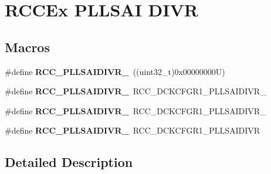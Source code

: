 \hypertarget{group___r_c_c_ex___p_l_l_s_a_i___d_i_v_r}{}\section{R\+C\+C\+Ex P\+L\+L\+S\+AI D\+I\+VR}
\label{group___r_c_c_ex___p_l_l_s_a_i___d_i_v_r}
\subsection*{Macros}
\begin{DoxyCompactItemize}
\item 
\mbox{\label{group___r_c_c_ex___p_l_l_s_a_i___d_i_v_r_gaa982ada83c0104fa63c18d07edc57e6a}} 
\#define {\bfseries R\+C\+C\+\_\+\+P\+L\+L\+S\+A\+I\+D\+I\+V\+R\+\_}~((uint32\+\_\+t)0x00000000\+U)
\item 
\mbox{\label{group___r_c_c_ex___p_l_l_s_a_i___d_i_v_r_ga31afbd678ec2b1bb3cc61971e59f4200}} 
\#define {\bfseries R\+C\+C\+\_\+\+P\+L\+L\+S\+A\+I\+D\+I\+V\+R\+\_}~R\+C\+C\+\_\+\+D\+C\+K\+C\+F\+G\+R1\+\_\+\+P\+L\+L\+S\+A\+I\+D\+I\+V\+R\+\_
\item 
\mbox{\label{group___r_c_c_ex___p_l_l_s_a_i___d_i_v_r_ga5744d352d7815517bbfe46b872497334}} 
\#define {\bfseries R\+C\+C\+\_\+\+P\+L\+L\+S\+A\+I\+D\+I\+V\+R\+\_}~R\+C\+C\+\_\+\+D\+C\+K\+C\+F\+G\+R1\+\_\+\+P\+L\+L\+S\+A\+I\+D\+I\+V\+R\+\_
\item 
\mbox{\label{group___r_c_c_ex___p_l_l_s_a_i___d_i_v_r_ga5e4b0cae8d6c2f0257b161576d497c77}} 
\#define {\bfseries R\+C\+C\+\_\+\+P\+L\+L\+S\+A\+I\+D\+I\+V\+R\+\_}~R\+C\+C\+\_\+\+D\+C\+K\+C\+F\+G\+R1\+\_\+\+P\+L\+L\+S\+A\+I\+D\+I\+VR
\end{DoxyCompactItemize}


\subsection{Detailed Description}
